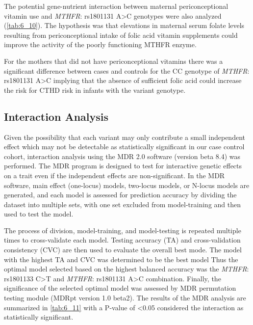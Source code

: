 \begin{refsection}
The potential gene-nutrient interaction between maternal periconceptional vitamin use and \textit{MTHFR}: rs1801131 A>C genotypes were also analyzed (\cref{tab:6_10}). The hypothesis was that elevations in maternal serum folate levels resulting from periconceptional intake of folic acid vitamin supplements could improve the activity of the poorly functioning MTHFR enzyme. 

For the mothers that did not have periconceptional vitamins there was a significant difference between cases and controls for the CC genotype of \textit{MTHFR}: rs1801131 A>C implying that the absence of sufficient folic acid could increase the risk for CTHD risk in infants with the variant genotype.



\subsection{Interaction Analysis}

Given the possibility that each variant may only contribute a small independent effect which may not be detectable as statistically significant in our case control cohort, interaction analysis using the MDR 2.0 software (version beta 8.4) was performed. The MDR program is designed to test for interactive genetic effects on a trait even if the independent effects are non-significant. In the MDR software, main effect (one-locus) models, two-locus models, or N-locus models are generated, and each model is assessed for prediction accuracy by dividing the dataset into multiple sets, with one set excluded from model-training and then used to test the model. 

The process of division, model-training, and model-testing is repeated multiple times to cross-validate each model. Testing accuracy (TA) and cross-validation consistency (CVC) are then used to evaluate the overall best mode. The model with the highest TA and CVC was determined to be the best model Thus the optimal model selected based on the highest balanced accuracy was the \textit{MTHFR}: rs1801133 C>T and \textit{MTHFR}: rs1801131 A>C combination. Finally, the significance of the selected optimal model was assessed by MDR permutation testing module (MDRpt version 1.0 beta2). The results of the MDR analysis are summarized in \cref{tab:6_11} with a P-value of <0.05 considered the interaction as statistically significant.


\end{refsection}
